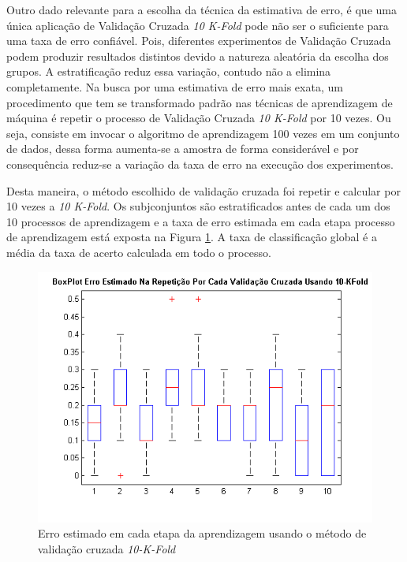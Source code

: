 Outro dado relevante para a escolha da técnica da estimativa de erro, é que uma única aplicação de Validação Cruzada \textit{10 K-Fold} pode não ser o suficiente para uma taxa de erro confiável. Pois, diferentes experimentos de Validação Cruzada podem produzir resultados distintos devido a natureza aleatória da escolha dos grupos. A estratificação reduz essa variação, contudo não a elimina completamente. Na busca por uma estimativa de erro mais exata, um procedimento que tem se transformado padrão nas técnicas de aprendizagem de máquina é repetir o processo de Validação Cruzada \textit{10 K-Fold} por 10 vezes. Ou seja, consiste em invocar o algoritmo de aprendizagem 100 vezes em um conjunto de dados, dessa forma aumenta-se a amostra de forma considerável e por consequência reduz-se a variação da taxa de erro na execução dos experimentos.

Desta maneira, o método escolhido de validação cruzada foi repetir e calcular por 10 vezes a \textit{10 K-Fold}. Os subjconjuntos são estratificados antes de cada um dos 10 processos de aprendizagem e a taxa de erro estimada em cada etapa processo de aprendizagem está exposta na Figura \ref{fig:erroestimadopca}. A taxa de classificação global é a média da taxa de acerto calculada em todo o processo.

\begin{figure}
 \centering
 \includegraphics[scale=0.6]{./img/boxplot-eigengaits-parkinsondatabase-error-kfold.png}
\caption{Erro estimado em cada etapa da aprendizagem usando o método de validação cruzada \textit{10-K-Fold}}
 \label{fig:erroestimadopca}
\end{figure}


